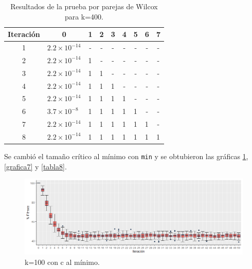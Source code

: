 \documentclass{article}
\begin{document}
\begin{table}[h!]
\centering
\caption{Resultados de la prueba por parejas de Wilcox para k=400.}
\label{tabla11}
\begin{tabular}{|c|l|l|l|l|c|c|c|c|}
\hline
Iteración & \multicolumn{1}{c|}{\textbf{0}} & \multicolumn{1}{c|}{\textbf{1}} & \multicolumn{1}{c|}{\textbf{2}} & \multicolumn{1}{c|}{\textbf{3}} & \textbf{4} & 5 & 6 & 7 \\ \hline
1 & $2.2\times 10^{-14}$ & \multicolumn{1}{c|}{-} & \multicolumn{1}{c|}{-} & \multicolumn{1}{c|}{-} & - & - & - & - \\ \hline
2 & $2.2\times 10^{-14}$ & 1 & \multicolumn{1}{c|}{-} & \multicolumn{1}{c|}{-} & - & - & - & - \\ \hline
3 & $2.2\times 10^{-14}$ & 1 & 1 & \multicolumn{1}{c|}{-} & - & - & - & - \\ \hline
4 & $2.2\times 10^{-14}$ & 1 & 1 & 1 & - & - & - & - \\ \hline
5 & $2.2\times 10^{-14}$ & 1 & 1 & 1 & \multicolumn{1}{l|}{1} & - & - & - \\ \hline
6 & $3.7\times 10^{-8}$ & 1 & 1 & 1 & \multicolumn{1}{l|}{1} & \multicolumn{1}{l|}{1} & - & - \\ \hline
7 & $2.2\times 10^{-14}$ & 1 & 1 & 1 & \multicolumn{1}{l|}{1} & \multicolumn{1}{l|}{1} & \multicolumn{1}{l|}{1} & - \\ \hline
8 & $2.2\times 10^{-14}$ & 1 & 1 & 1 & \multicolumn{1}{l|}{1} & \multicolumn{1}{l|}{1} & \multicolumn{1}{l|}{1} & \multicolumn{1}{l|}{1} \\ \hline
\end{tabular}
\end{table}

Se cambió el tamaño crítico al mínimo con \texttt{min} y se obtubieron las gráficas \ref{grafica6}, \ref{grafica7} y \ref{tabla8}.

\begin{figure} [h!]%
\renewcommand{\figurename}{Gráfica}
    \centering
    \caption{ k=100 con c al mínimo.}
    \label{grafica6}
    \includegraphics[width=170mm]{grafica6.png} %
\end{figure}
\end{document}
